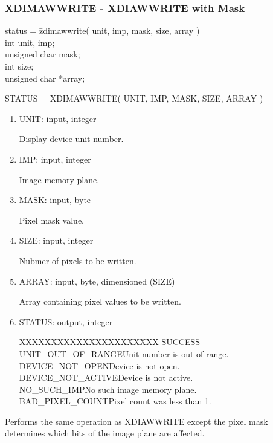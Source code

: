 \subsubsection{XDIMAWWRITE - XDIAWWRITE with Mask}
\begin{tabbing}
status = \=zdimawwrite( unit, imp, mask, size, array )\\
\>int  unit, imp;\\
\>unsigned char mask;\\
\>int  size;\\
\>unsigned char  *array;\\
\end{tabbing}
STATUS = XDIMAWWRITE( UNIT, IMP, MASK, SIZE, ARRAY )
\begin{enumerate}
\item UNIT:  input, integer

Display device unit number.
\item IMP:  input, integer

Image memory plane.
\item MASK:  input, byte

Pixel mask value.
\item SIZE:  input, integer

Nubmer of pixels to be written.
\item ARRAY:  input, byte, dimensioned (SIZE)

Array containing pixel values to be written.
\item STATUS:  output, integer
\begin{tabbing}
XXXXXXXXXXXXXXXXXXXXXX\=\kill
SUCCESS\\
UNIT\_OUT\_OF\_RANGE\>Unit number is out of range.\\
DEVICE\_NOT\_OPEN\>Device is not open.\\
DEVICE\_NOT\_ACTIVE\>Device is not active.\\
NO\_SUCH\_IMP\>No such image memory plane.\\
BAD\_PIXEL\_COUNT\>Pixel count was less than 1.\\
\end{tabbing}
\end{enumerate}
Performs the same operation as XDIAWWRITE except the pixel mask
determines which bits of the image plane are affected.
\newpage
